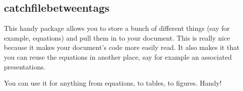 \documentclass[hidelinks, float=false, crop=false]{standalone}
\begin{document}
        \subsection{catchfilebetweentags}
            This handy package allows you to store a bunch of different things (say for example, equations) and pull them in to your document. This is really nice because it makes your document's code more easily read. It also makes it that you can reuse the equations in another place, say for example an associated presentations.

            You can use it for anything from equations,
            to tables,
            to figures.
            Handy!

    \clearpage
    \standaloneBib
\end{document}
